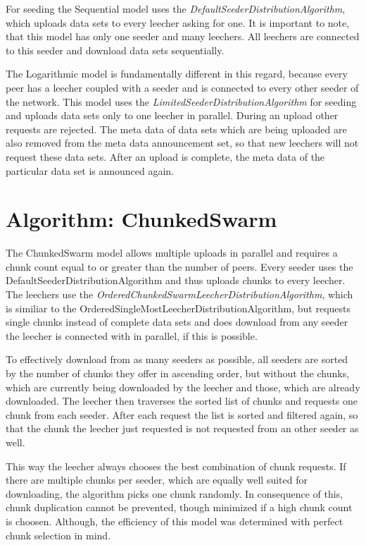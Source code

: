 For seeding the Sequential model uses the \emph{DefaultSeederDistributionAlgorithm}, which uploads data sets to every leecher asking for one. It is important to note, that this model has only one seeder and many leechers. All leechers are connected to this seeder and download data sets sequentially. 

The Logarithmic model is fundamentally different in this regard, because every peer has a leecher coupled with a seeder and is connected to every other seeder of the network. This model uses the \emph{LimitedSeederDistributionAlgorithm} for seeding and uploads data sets only to one leecher in parallel. During an upload other requests are rejected. The meta data of data sets which are being uploaded are also removed from the meta data announcement set, so that new leechers will not request these data sets. After an upload is complete, the meta data of the particular data set is announced again.

\section{Algorithm: ChunkedSwarm}
\label{sec:chunkedswarm}
The ChunkedSwarm model allows multiple uploads in parallel and requires a chunk count equal to or greater than the number of peers. Every seeder uses the DefaultSeederDistributionAlgorithm and thus uploads chunks to every leecher. The leechers use the \emph{OrderedChunkedSwarmLeecherDistributionAlgorithm}, which is similiar to the OrderedSingleMostLeecherDistributionAlgorithm, but requests single chunks instead of complete data sets and does download from any seeder the leecher is connected with in parallel, if this is possible. 

To effectively download from as many seeders as possible, all seeders are sorted by the number of chunks they offer in ascending order, but without the chunks, which are currently being downloaded by the leecher and those, which are already downloaded. The leecher then traverses the sorted list of chunks and requests one chunk from each seeder. After each request the list is sorted and filtered again, so that the chunk the leecher just requested is not requested from an other seeder as well. 

This way the leecher always chooses the best combination of chunk requests. If there are multiple chunks per seeder, which are equally well suited for downloading, the algorithm picks one chunk randomly. In consequence of this, chunk duplication cannot be prevented, though minimized if a high chunk count is choosen. Although, the efficiency of this model was determined with perfect chunk selection in mind. 

